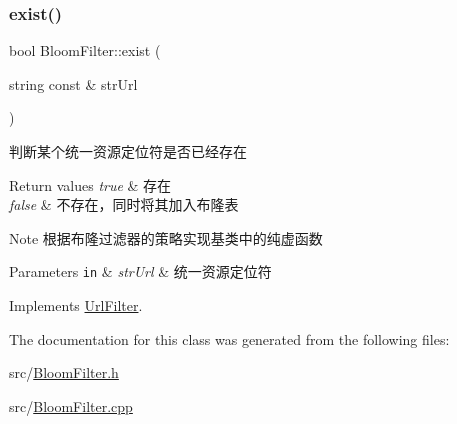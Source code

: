 \subsubsection{\texorpdfstring{exist()}{exist()}}
{\footnotesize\ttfamily bool Bloom\+Filter\+::exist (\begin{DoxyParamCaption}\item[{string const \&}]{str\+Url }\end{DoxyParamCaption})\hspace{0.3cm}{\ttfamily [virtual]}}



判断某个统一资源定位符是否已经存在 


\begin{DoxyRetVals}{Return values}
{\em true} & 存在 \\
\hline
{\em false} & 不存在，同时将其加入布隆表 \\
\hline
\end{DoxyRetVals}
\begin{DoxyNote}{Note}
根据布隆过滤器的策略实现基类中的纯虚函数 
\end{DoxyNote}

\begin{DoxyParams}[1]{Parameters}
\mbox{\tt in}  & {\em str\+Url} & 统一资源定位符 \\
\hline
\end{DoxyParams}


Implements \hyperlink{class_url_filter_a581b9ea03daefbf52344ceb3371f409a}{Url\+Filter}.



The documentation for this class was generated from the following files\+:\begin{DoxyCompactItemize}
\item 
src/\hyperlink{_bloom_filter_8h}{Bloom\+Filter.\+h}\item 
src/\hyperlink{_bloom_filter_8cpp}{Bloom\+Filter.\+cpp}\end{DoxyCompactItemize}
